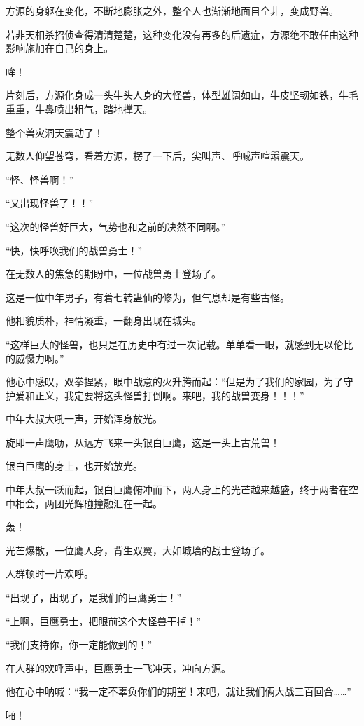 \begin{this_body}
方源的身躯在变化，不断地膨胀之外，整个人也渐渐地面目全非，变成野兽。

若非天相杀招侦查得清清楚楚，这种变化没有再多的后遗症，方源绝不敢任由这种影响施加在自己的身上。

哞！

片刻后，方源化身成一头牛头人身的大怪兽，体型雄阔如山，牛皮坚韧如铁，牛毛重重，牛鼻喷出粗气，踏地撑天。

整个兽灾洞天震动了！

无数人仰望苍穹，看着方源，楞了一下后，尖叫声、呼喊声喧嚣震天。

“怪、怪兽啊！”

“又出现怪兽了！！”

“这次的怪兽好巨大，气势也和之前的决然不同啊。”

“快，快呼唤我们的战兽勇士！”

在无数人的焦急的期盼中，一位战兽勇士登场了。

这是一位中年男子，有着七转蛊仙的修为，但气息却是有些古怪。

他相貌质朴，神情凝重，一翻身出现在城头。

“这样巨大的怪兽，也只是在历史中有过一次记载。单单看一眼，就感到无以伦比的威慑力啊。”

他心中感叹，双拳捏紧，眼中战意的火升腾而起：“但是为了我们的家园，为了守护爱和正义，我定要将这头怪兽打倒啊。来吧，我的战兽变身！！！”

中年大叔大吼一声，开始浑身放光。

旋即一声鹰呖，从远方飞来一头银白巨鹰，这是一头上古荒兽！

银白巨鹰的身上，也开始放光。

中年大叔一跃而起，银白巨鹰俯冲而下，两人身上的光芒越来越盛，终于两者在空中相会，两团光辉碰撞融汇在一起。

轰！

光芒爆散，一位鹰人身，背生双翼，大如城墙的战士登场了。

人群顿时一片欢呼。

“出现了，出现了，是我们的巨鹰勇士！”

“上啊，巨鹰勇士，把眼前这个大怪兽干掉！”

“我们支持你，你一定能做到的！”

在人群的欢呼声中，巨鹰勇士一飞冲天，冲向方源。

他在心中呐喊：“我一定不辜负你们的期望！来吧，就让我们俩大战三百回合……”

啪！


\end{this_body}
